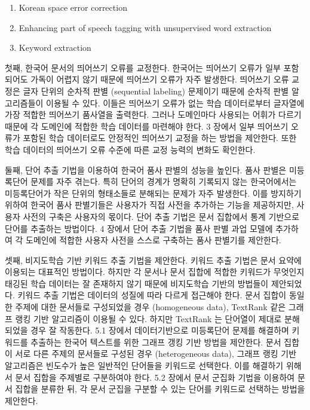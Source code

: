 \documentclass[11pt]{article}
\begin{document}
\begin{enumerate}[noitemsep]
    \item Korean space error correction
    \item Enhancing part of speech tagging with unsupervised word extraction
    \item Keyword extraction
\end{enumerate}

첫째, 한국어 문서의 띄어쓰기 오류를 교정한다.
한국어는 띄어쓰기 오류가 일부 포함되어도 가독이 어렵지 않기 때문에 띄어쓰기 오류가 자주 발생한다.
띄어쓰기 오류 교정은 글자 단위의 순차적 판별 (sequential labeling) 문제이기 때문에 순차적 판별 알고리즘들이 이용될 수 있다.
이들은 띄어쓰기 오류가 없는 학습 데이터로부터 글자열에 가장 적합한 띄어쓰기 품사열을 출력한다.
그러나 도메인마다 사용되는 어휘가 다르기 때문에 각 도메인에 적합한 학습 데이터를 마련해야 한다.
3 장에서 일부 띄어쓰기 오류가 포함된 학습 데이터로도 안정적인 띄어쓰기 교정을 하는 방법을 제안한다.
또한 학습 데이터의 띄어쓰기 오류 수준에 따른 교정 능력의 변화도 확인한다.

둘째, 단어 추출 기법을 이용하여 한국어 품사 판별의 성능을 높인다.
품사 판별은 미등록단어 문제를 자주 겪는다.
특히 단어의 경계가 명확히 기록되지 않는 한국어에서는 미등록단어가 작은 단위의 형태소들로 분해되는 문제가 자주 발생한다.
이를 방지하기 위하여 한국어 품사 판별기들은 사용자가 직접 사전을 추가하는 기능을 제공하지만, 사용자 사전의 구축은 사용자의 몫이다.
단어 추출 기법은 문서 집합에서 통계 기반으로 단어를 추출하는 방법이다.
4 장에서 단어 추출 기법을 품사 판별 과업 모델에 추가하여 각 도메인에 적합한 사용자 사전을 스스로 구축하는 품사 판별기를 제안한다.

셋째, 비지도학습 기반 키워드 추출 기법을 제안한다.
키워드 추출 기법은 문서 요약에 이용되는 대표적인 방법이다.
하지만 각 문서나 문서 집합에 적합한 키워드가 무엇인지 태깅된 학습 데이터는 잘 존재하지 않기 때문에 비지도학습 기반의 방법들이 제안되었다.
키워드 추출 기법은 데이터의 성질에 따라 다르게 접근해야 한다.
문서 집합이 동일한 주제에 대한 문서들로 구성되었을 경우 (homogeneous data), TextRank \citep{mihalcea2004textrank} 같은 그래프 랭킹 기반 알고리즘이 이용될 수 있다.
하지만 TextRank 는 단어열이 제대로 분해되었을 경우 잘 작동한다.
5.1 장에서 데이터기반으로 미등록단어 문제를 해결하며 키워드를 추출하는 한국어 텍스트를 위한 그래프 갱킹 기반 방법을 제안한다.
문서 집합이 서로 다른 주제의 문서들로 구성된 경우 (heterogeneous data), 그래프 랭킹 기반 알고리즘은 빈도수가 높은 일반적인 단어들을 키워드로 선택한다.
이를 해결하기 위해서 문서 집합을 주제별로 구분하여야 한다.
5.2 장에서 문서 군집화 기법을 이용하여 문서 집합을 분류한 뒤, 각 문서 군집을 구분할 수 있는 단어를 키워드로 선택하는 방법을 제안한다.
\end{document}
